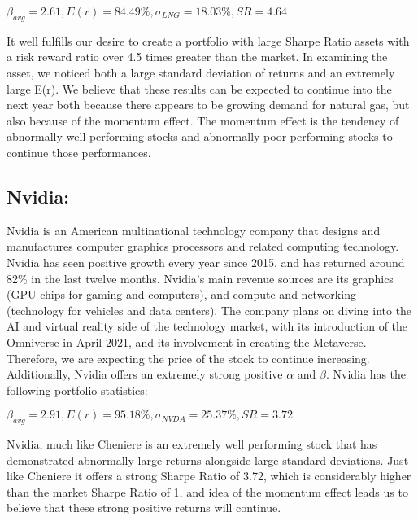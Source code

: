 \documentclass{article}
\begin{document}
\begin{center}
    \begin{math}
        \beta_{avg} = 2.61, E(r) = 84.49\%, \sigma_{LNG} = 18.03\%, SR = 4.64
    \end{math}
\end{center}

It well fulfills our desire to create a portfolio with large Sharpe Ratio assets with a risk reward ratio over 4.5 times greater than the market. In examining the asset, we noticed both a large standard deviation of returns and an extremely large E(r). We believe that these results can be expected to continue into the next year both because there appears to be growing demand for natural gas, but also because of the momentum effect. The momentum effect is the tendency of abnormally well performing stocks and abnormally poor performing stocks to continue those performances. 

\subsection{Nvidia:}

Nvidia is an American multinational technology company that designs and manufactures computer graphics processors and related computing technology.  Nvidia has seen positive growth every year since 2015, and has returned around 82\% in the last twelve months.  Nvidia’s main revenue sources are its graphics (GPU chips for gaming and computers), and compute and networking (technology for vehicles and data centers).  The company plans on diving into the AI and virtual reality side of the technology market, with its introduction of the Omniverse in April 2021, and its involvement in creating the Metaverse. Therefore, we are expecting the price of the stock to continue increasing. Additionally, Nvidia offers an extremely strong positive $\alpha$ and $\beta$. Nvidia has the following portfolio statistics:

\begin{center}
    \begin{math}
        \beta_{avg} = 2.91, E(r) = 95.18\%, \sigma_{NVDA} = 25.37\%, SR = 3.72
    \end{math}
\end{center}

Nvidia, much like Cheniere is an extremely well performing stock that has demonstrated abnormally large returns alongside large standard deviations. Just like Cheniere it offers a strong Sharpe Ratio of 3.72, which is considerably higher than the market Sharpe Ratio of 1, and idea of the momentum effect leads us to believe that these strong positive returns will continue. 
\end{document}
